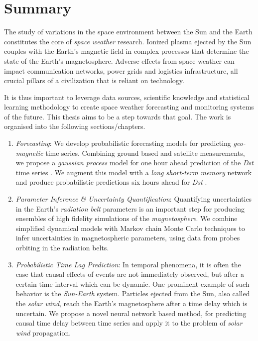 \chapter*{Summary}\label{chapter:abstract}

The study of variations in the space environment between the Sun and the Earth constitutes 
the core of \textit{space weather} research. Ionized plasma ejected by the Sun couples with 
the Earth’s magnetic field in complex processes that determine the state of the Earth's 
magnetosphere. Adverse effects from space weather can impact communication networks, 
power grids and logistics infrastructure, all crucial pillars of a civilization that 
is reliant on technology.

It is thus important to leverage data sources, scientific knowledge and statistical learning 
methodology to create space weather forecasting and monitoring systems of the future. This 
thesis aims to be a step towards that goal. The work is organised into the following 
sections/chapters.

\begin{enumerate}
\item \textit{Forecasting}: We develop probabilistic forecasting models for predicting 
\textit{geo-magnetic} time series. Combining ground based and satellite measurements, 
we propose a \textit{gaussian process} model for one hour ahead prediction of the \textit{Dst} 
time series \citep{ChandorkarDst,CHANDORKAR2018237}. We augment this model with a 
\textit{long short-term memory} network and produce probabilistic predictions six hours 
ahead for \textit{Dst} \citep{doi:10.1029/2018SW001898}.

\item \textit{Parameter Inference \& Uncertainty Quantification}: Quantifying uncertainties in the 
Earth's \textit{radiation belt} parameters is an important step for producing ensembles of high 
fidelity simulations of the \textit{magnetosphere}. We combine simplified dynamical models with 
Markov chain Monte Carlo techniques to infer uncertainties in magnetospheric parameters, 
using data from probes orbiting in the radiation belts.

\item \textit{Probabilistic Time Lag Prediction}: In temporal phenomena, it is often the case 
that causal effects of events are not immediately observed, but after a certain time interval 
which can be dynamic. One prominent example of such behavior is the \textit{Sun-Earth} system. 
Particles ejected from the Sun, also called the \textit{solar wind}, reach the Earth's magnetosphere 
after a time delay which is uncertain. We propose a novel neural network based method, for 
predicting causal time delay between time series and apply it to the problem of 
\textit{solar wind} propagation.

\end{enumerate}

%

%

